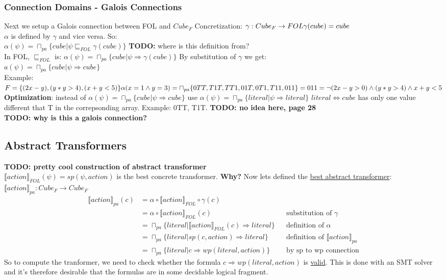 \subsubsection{Connection Domains - Galois Connections}
Next we setup a Galois connection between FOL and $Cube_F$
Concretization: $\gamma: Cube_F \to FOL\\ \gamma(cube) = cube$\\ $\alpha$ is defined by $\gamma$ and vice versa. So: \\
$\alpha(\psi) = \sqcap_{pa}\{cube | \psi \sqsubseteq_{FOL}\gamma(cube)\}$ \textbf{TODO:} where is this definition from?\\
In FOL, $\sqsubseteq_{FOL}$ is: $\alpha(\psi) = \sqcap_{pa}\{cube | \psi \Rightarrow \gamma(cube)\}$ By substitution of $\gamma$ we get:\\
\underline{$a(\psi)=\sqcap_{pa}\{cube|\psi \Rightarrow cube\}$}\\
Example:\\
$F=\{(2x-y), (y*y>4), (x+y<5)\}\\
\alpha(x=1 \wedge y=3) = \sqcap_{pa}\{0TT, T1T, TT1, 01T, 0T1, T11, 011\} = 011 = \neg(2x-y>0)\wedge (y*y>4)\wedge x+y<5$\\
\textbf{Optimization}: instead of $\alpha(\psi)=\sqcap_{pa}\{cube | \psi \Rightarrow cube\}$ use $\alpha(\psi)=\sqcap_{pa}\{literal|\psi \Rightarrow literal\}$
$literal \iff cube$ has only one value different that T in the correpsonding array. Example: 0TT, T1T. \textbf{TODO: no idea here, page 28}\\
\textbf{TODO: why is this a galois connection?}
\subsection{Abstract Transformers}
\textbf{TODO: pretty cool construction of abstract transformer}\\
$\llbracket action \rrbracket_{FOL}(\psi) = sp(\psi, action)$ is the best concrete transformer. \textbf{Why?} Now lets defined the \underline{best abstract transformer}: $\llbracket action \rrbracket_{pa}:Cube_F \to Cube_F$
\begin{align}
    \llbracket action \rrbracket_{pa}(c) 
    &= \alpha \circ \llbracket action \rrbracket_{FOL} \circ \gamma(c)
    \\&= \alpha \circ \llbracket action \rrbracket_{FOL}(c) && \text{substitution of $\gamma$}
    \\&= \sqcap_{pa}\{literal | \llbracket action \rrbracket_{FOL}(c) \Rightarrow literal\} && \text{definition of $\alpha$}
    \\&=\sqcap_{pa}\{literal | sp(c,action) \Rightarrow literal\} &&\text{definition of $\llbracket action \rrbracket_{pa}$}
    \\&=\sqcap_{pa}\{literal | c \Rightarrow wp(literal, action)\} &&\text{by sp to wp connection}
\end{align}
So to compute the tranformer, we need to check whether the formula $c \Rightarrow wp(literal, action)$ is \underline{valid}. This is done with an SMT solver and it's therefore desirable that the formulas are in some decidable logical fragment.
